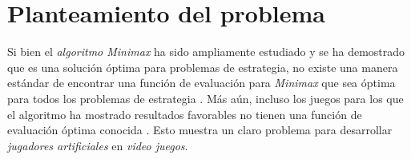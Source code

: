 \section{Planteamiento del problema}
  Si bien el \textit{algoritmo Minimax} ha sido ampliamente estudiado y se ha demostrado que es una
  solución óptima para problemas de estrategia, no existe una manera estándar de encontrar una
  función de evaluación para \textit{Minimax} que sea óptima para todos los problemas de estrategia
  \autocite{dyerCS540Lecture}.
  Más aún, incluso los juegos para los que el algoritmo ha mostrado resultados favorables no tienen
  una función de evaluación óptima conocida \autocite{shannonProgrammingComputerPlaying1988}.
  Esto muestra un claro problema para desarrollar \textit{jugadores artificiales} en \textit{video 
  juegos}.